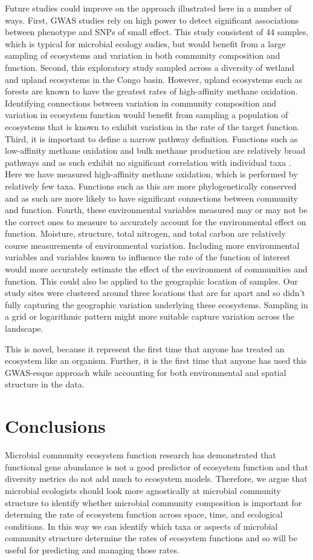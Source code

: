 \documentclass{article}
\begin{document}
Future studies could improve on the approach illustrated here in a number of
ways. First, GWAS studies rely on high power to detect significant associations
between phenotype and SNPs of small effect. This study consistent of 44 samples,
which is typical for microbial ecology sudies, but would benefit from a large
sampling of ecosystems and variation in both community composition and function. 
Second, this exploratory study sampled across
a diversity of wetland and upland ecosystems in the Congo basin. However, upland
ecosystems such as forests are known to have the greatest rates of high-affinity
methane oxidation. Identifying connections between variation in community
composition and variation in ecosystem function would benefit from sampling a
population of ecosystems that is known to exhibit variation in the rate of
the target function. Third, it is important to define a narrow pathway
definition. Functions such as low-affinity methane oxidation and bulk methane
production are relatively broad pathways and as such exhibit no significant
correlation with individual taxa \citep{meyer2019}. Here we have measured
high-affinity methane oxidation, which is performed by relatively few taxa.
Functions such as this are more phylogenetically conserved and as such are more
likely to have significant connections between community and function. Fourth,
these environmental variables measured may or may not be the correct ones to
measure to accurately account for the environmental effect on function.
Moisture, structure, total nitrogen, and total carbon are relatively course
measurements of environmental variation. Including more environmental variables
and variables known to influence the rate of the function of interest would more
accurately estimate the effect of the environment of communities and function.
This could also be applied to the geographic location of samples. Our study
sites were clustered around three locations that are far apart and so didn't
fully capturing the geographic variation underlying these ecosystems. Sampling
in a grid or logarithmic pattern might more suitable capture variation across
the landscape. 

This is novel, because it represent the first time that anyone has treated an
ecosystem like an organism. Further, it is the first time that anyone has
used this GWAS-esque approach while accounting for both environmental and
spatial structure in the data. 

\section{Conclusions}
Microbial community ecosystem function research has demonstrated that
functional gene abundance is not a good predictor of ecosystem function and
that diversity metrics do not add much to ecosystem models. Therefore, we
argue that microbial ecologists should look more agnostically at microbial
community structure to identify whether microbial community composition is
important for determing the rate of ecosystem function across space, time,
and ecological conditions. In this way we can identify which taxa or aspects of
microbial community structure determine the rates of ecosystem functions and so
will be useful for predicting and managing those rates. 
\end{document}
